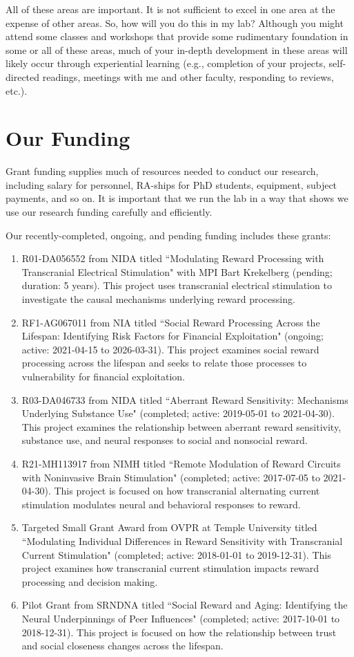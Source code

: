 \documentclass[letterpaper,11pt,oneside]{memoir}
\begin{document}
All of these areas are important. It is not sufficient to excel in one area at the expense of other areas. So, how will you do this in my lab? Although you might attend some classes and workshops that provide some rudimentary foundation in some or all of these areas, much of your in-depth development in these areas will likely occur through experiential learning (e.g., completion of your projects, self-directed readings, meetings with me and other faculty, responding to reviews, etc.).


\section{Our Funding}

Grant funding supplies much of resources needed to conduct our research, including salary for personnel, RA-ships for PhD students, equipment, subject payments, and so on. It is important that we run the lab in a way that shows we use our research funding carefully and efficiently.

Our recently-completed, ongoing, and pending funding includes these grants:

\begin{enumerate}
\item R01-DA056552 from NIDA titled ``Modulating Reward Processing with Transcranial Electrical Stimulation" with MPI Bart Krekelberg (pending; duration: 5 years). This project uses transcranial electrical stimulation to investigate the causal mechanisms underlying reward processing.
\item RF1-AG067011 from NIA titled ``Social Reward Processing Across the Lifespan: Identifying Risk Factors for Financial Exploitation" (ongoing; active: 2021-04-15 to 2026-03-31). This project examines social reward processing across the lifespan and seeks to relate those processes to vulnerability for financial exploitation.
\item R03-DA046733 from NIDA titled ``Aberrant Reward Sensitivity: Mechanisms Underlying Substance Use" (completed; active: 2019-05-01 to 2021-04-30). This project examines the relationship between aberrant reward sensitivity, substance use, and neural responses to social and nonsocial reward. 
\item R21-MH113917 from NIMH titled ``Remote Modulation of Reward Circuits with Noninvasive Brain Stimulation" (completed; active: 2017-07-05 to 2021-04-30). This project is focused on how transcranial alternating current stimulation modulates neural and behavioral responses to reward. 
\item Targeted Small Grant Award from OVPR at Temple University titled ``Modulating Individual Differences in Reward Sensitivity with Transcranial Current Stimulation" (completed; active: 2018-01-01 to 2019-12-31). This project examines how transcranial current stimulation impacts reward processing and decision making.
\item Pilot Grant from SRNDNA titled ``Social Reward and Aging: Identifying the Neural Underpinnings of Peer Influences" (completed; active: 2017-10-01 to 2018-12-31). This project is focused on how the relationship between trust and social closeness changes across the lifespan. 
\end{enumerate}
\end{document}

